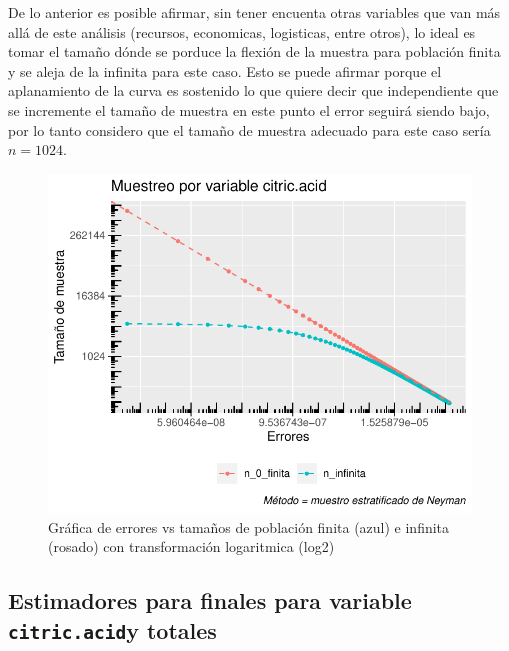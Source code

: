 \documentclass[
]{article}
\begin{document}
De lo anterior es posible afirmar, sin tener encuenta otras variables
que van más allá de este análisis (recursos, economicas, logisticas,
entre otros), lo ideal es tomar el tamaño dónde se porduce la flexión de
la muestra para población finita y se aleja de la infinita para este
caso. Esto se puede afirmar porque el aplanamiento de la curva es
sostenido lo que quiere decir que independiente que se incremente el
tamaño de muestra en este punto el error seguirá siendo bajo, por lo
tanto considero que el tamaño de muestra adecuado para este caso sería
\(n=1024\).

\begin{figure}
\centering
\includegraphics{test_2_files/figure-latex/grap uno de errores log2-1.pdf}
\caption{Gráfica de errores vs tamaños de población finita (azul) e
infinita (rosado) con transformación logaritmica (log2)}
\end{figure}

\hypertarget{estimadores-para-finales-para-variable-citric.acidy-totales}{%
\subsection{\texorpdfstring{Estimadores para finales para variable
\texttt{citric.acid}y
totales}{Estimadores para finales para variable citric.acidy totales}}\label{estimadores-para-finales-para-variable-citric.acidy-totales}}
\end{document}
